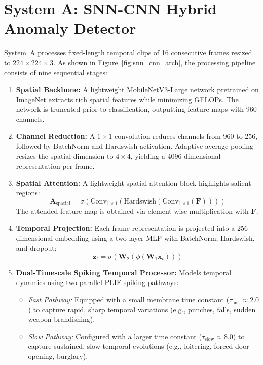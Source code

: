 \documentclass[12pt,a4paper]{report}
\begin{document}
\section{System A: SNN-CNN Hybrid Anomaly Detector}
System~A processes fixed-length temporal clips of 16 consecutive frames resized to $224 \times 224 \times 3$. As shown in Figure~\ref{fig:snn_cnn_arch}, the processing pipeline consists of nine sequential stages:
\begin{enumerate}
    \item \textbf{Spatial Backbone:} A lightweight MobileNetV3-Large network pretrained on ImageNet extracts rich spatial features while minimizing GFLOPs. The network is truncated prior to classification, outputting feature maps with 960 channels.
    \item \textbf{Channel Reduction:} A $1 \times 1$ convolution reduces channels from 960 to 256, followed by BatchNorm and Hardswish activation. Adaptive average pooling resizes the spatial dimension to $4 \times 4$, yielding a 4096-dimensional representation per frame.
    \item \textbf{Spatial Attention:} A lightweight spatial attention block highlights salient regions:
    \begin{equation}
        \mathbf{A}_{\text{spatial}} = \sigma \left( \text{Conv}_{1 \times 1} \left( \text{Hardswish} \left( \text{Conv}_{1 \times 1}(\mathbf{F}) \right) \right) \right)
    \end{equation}
    The attended feature map is obtained via element-wise multiplication with $\mathbf{F}$.
    \item \textbf{Temporal Projection:} Each frame representation is projected into a 256-dimensional embedding using a two-layer MLP with BatchNorm, Hardswish, and dropout:
    \begin{equation}
        \mathbf{z}_t = \sigma \left( \mathbf{W}_2 \left( \phi(\mathbf{W}_1 \mathbf{x}_t) \right) \right)
    \end{equation}
    \item \textbf{Dual-Timescale Spiking Temporal Processor:} Models temporal dynamics using two parallel PLIF spiking pathways:
    \begin{itemize}
        \item \textit{Fast Pathway:} Equipped with a small membrane time constant ($\tau_{\text{fast}} \approx 2.0$) to capture rapid, sharp temporal variations (e.g., punches, falls, sudden weapon brandishing).
        \item \textit{Slow Pathway:} Configured with a larger time constant ($\tau_{\text{slow}} \approx 8.0$) to capture sustained, slow temporal evolutions (e.g., loitering, forced door opening, burglary).

\end{itemize}
\end{enumerate}
\end{document}
